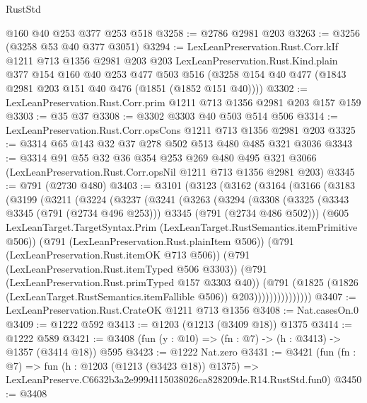 \begin{lexlean}{RustStd}
\begin{coremodule}
    @160
    @40
    @253
    @377
    @253
    @518
@3258 := @2786 @2981 @203
@3263 := @3256 (@3258 @53 @40 @377 @3051)
@3294 := LexLeanPreservation.Rust.Corr.kIf
    @1211
    @713
    @1356
    @2981
    @203
    @203
    LexLeanPreservation.Rust.Kind.plain
    @377
    @154
    @160
    @40
    @253
    @477
    @503
    @516
    (@3258 @154 @40 @477 (@1843 @2981 @203 @151 @40 @476 (@1851 (@1852 @151 @40))))
@3302 := LexLeanPreservation.Rust.Corr.prim @1211 @713 @1356 @2981 @203 @157 @159
@3303 := @35 @37
@3308 := @3302 @3303 @40 @503 @514 @506
@3314 := LexLeanPreservation.Rust.Corr.opsCons @1211 @713 @1356 @2981 @203
@3325 := @3314 @65 @143 @32 @37 @278 @502 @513 @480 @485 @321 @3036
@3343 := @3314
    @91
    @55
    @32
    @36
    @354
    @253
    @269
    @480
    @495
    @321
    @3066
    (LexLeanPreservation.Rust.Corr.opsNil @1211 @713 @1356 @2981 @203)
@3345 := @791 (@2730 @480)
@3403 := @3101
    (@3123
      (@3162
        (@3164
          (@3166
            (@3183
              (@3199
                (@3211
                  (@3224
                    (@3237
                      (@3241
                        (@3263
                          (@3294
                            (@3308
                              (@3325
                                (@3343 @3345 (@791 (@2734 @496 @253)))
                                @3345
                                (@791 (@2734 @486 @502)))
                              (@605
                                LexLeanTarget.TargetSyntax.Prim
                                (LexLeanTarget.RustSemantics.itemPrimitive @506))
                              (@791 (LexLeanPreservation.Rust.plainItem @506))
                              (@791 (LexLeanPreservation.Rust.itemOK @713 @506))
                              (@791 (LexLeanPreservation.Rust.itemTyped @506 @3303))
                              (@791 (LexLeanPreservation.Rust.primTyped @157 @3303 @40))
                              (@791
                                (@1825
                                  (@1826 (LexLeanTarget.RustSemantics.itemFallible @506))
                                  @203)))))))))))))))
@3407 := LexLeanPreservation.Rust.CrateOK @1211 @713 @1356
@3408 := Nat.casesOn.{0}
@3409 := @1222 @592
@3413 := @1203 (@1213 (@3409 @18)) @1375
@3414 := @1222 @589
@3421 := @3408 (fun (y : @10) => (fn : @7) -> (h : @3413) -> @1357 (@3414 @18)) @595
@3423 := @1222 Nat.zero
@3431 := @3421
    (fun (fn : @7) =>
    fun (h : @1203 (@1213 (@3423 @18)) @1375) =>
    LexLeanPreserve.C6632b3a2e999d115038026ca828209de.R14.RustStd.fun0)
@3450 := @3408

\end{coremodule}
\end{lexlean}
